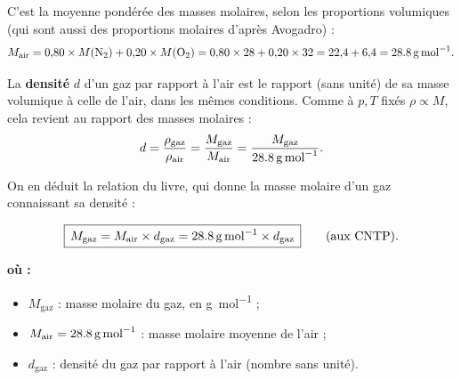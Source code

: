 \documentclass[11pt,a4paper]{article}
\newenvironment{ou}{%
  \par\smallskip\noindent\textbf{où :}\nopagebreak
  \begin{itemize}[leftmargin=1.8em,topsep=2pt,itemsep=1.5pt,parsep=0pt]}%
  {\end{itemize}}
\begin{document}
\begin{center}
\end{center}

\begin{remarque}
C'est la moyenne pondérée des masses molaires, selon les proportions volumiques (qui sont aussi des
proportions molaires d'après Avogadro) :
\[ M_{\text{air}} = 0{,}80\times M(\ce{N2}) + 0{,}20\times M(\ce{O2})
   = 0{,}80\times28 + 0{,}20\times32 = 22{,}4+6{,}4 = \qty{28{,}8}{\gram\per\mole}. \]
\end{remarque}

\begin{definition}
La \textbf{densité} $d$ d'un gaz par rapport à l'air est le rapport (sans unité) de sa masse volumique
à celle de l'air, dans les mêmes conditions. Comme à $p,T$ fixés $\rho\propto M$, cela revient au
rapport des masses molaires :
\[ d=\frac{\rho_{\text{gaz}}}{\rho_{\text{air}}}=\frac{M_{\text{gaz}}}{M_{\text{air}}}
    =\frac{M_{\text{gaz}}}{\qty{28{,}8}{\gram\per\mole}}. \]
\end{definition}

\noindent On en déduit la relation du livre, qui donne la masse molaire d'un gaz connaissant sa densité :

\begin{formule}
\[ \boxed{\,M_{\text{gaz}} = M_{\text{air}}\times d_{\text{gaz}} = \qty{28{,}8}{\gram\per\mole}\times
   d_{\text{gaz}}\,}\qquad(\text{aux CNTP}). \]
\end{formule}

\begin{ou}
  \item $M_{\text{gaz}}$ : masse molaire du gaz, en \si{\gram\per\mole} ;
  \item $M_{\text{air}}=\qty{28{,}8}{\gram\per\mole}$ : masse molaire moyenne de l'air ;
  \item $d_{\text{gaz}}$ : densité du gaz par rapport à l'air (nombre sans unité).
\end{ou}
\end{document}
